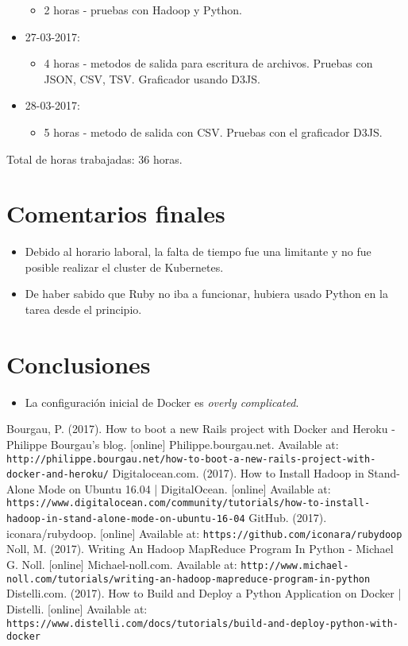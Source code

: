 \documentclass{article}
\begin{document}
\begin{itemize}
\begin{itemize}
    \item 2 horas - pruebas con Hadoop y Python.
  \end{itemize}
  \item 27-03-2017:
  \begin{itemize}
    \item 4 horas - metodos de salida para escritura de archivos. Pruebas con JSON, CSV, TSV. Graficador usando D3JS.
  \end{itemize}
  \item 28-03-2017:
  \begin{itemize}
    \item 5 horas - metodo de salida con CSV. Pruebas con el graficador D3JS.
  \end{itemize}
\end{itemize}
Total de horas trabajadas: 36 horas.

\section{Comentarios finales}
\begin{itemize}
  \item Debido al horario laboral, la falta de tiempo fue una limitante y no fue posible realizar el cluster de Kubernetes.
  \item De haber sabido que Ruby no iba a funcionar, hubiera usado Python en la tarea desde el principio.
\end{itemize}

\section{Conclusiones}
\begin{itemize}
  \item La configuraci\'on inicial de Docker es \emph{overly complicated}.
\end{itemize}

\begin{thebibliography}{99}
  Bourgau, P. (2017). How to boot a new Rails project with Docker and Heroku - Philippe Bourgau's blog. [online] Philippe.bourgau.net. Available at: \texttt{http://philippe.bourgau.net/how-to-boot-a-new-rails-project-with-docker-and-heroku/}
  Digitalocean.com. (2017). How to Install Hadoop in Stand-Alone Mode on Ubuntu 16.04 | DigitalOcean. [online] Available at: \texttt{https://www.digitalocean.com/community/tutorials/how-to-install-hadoop-in-stand-alone-mode-on-ubuntu-16-04}
  GitHub. (2017). iconara/rubydoop. [online] Available at: \texttt{https://github.com/iconara/rubydoop}
  Noll, M. (2017). Writing An Hadoop MapReduce Program In Python - Michael G. Noll. [online] Michael-noll.com. Available at: \texttt{http://www.michael-noll.com/tutorials/writing-an-hadoop-mapreduce-program-in-python}
  Distelli.com. (2017). How to Build and Deploy a Python Application on Docker | Distelli. [online] Available at: \texttt{https://www.distelli.com/docs/tutorials/build-and-deploy-python-with-docker}
\end{thebibliography}
\end{document}
